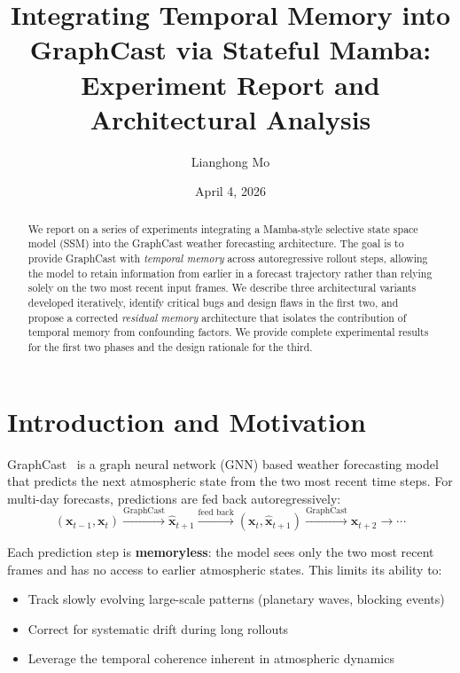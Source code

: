 \documentclass[11pt,a4paper]{article}
\title{Integrating Temporal Memory into GraphCast via Stateful Mamba:\\Experiment Report and Architectural Analysis}
\author{Lianghong Mo}
\date{April 4, 2026}
\begin{document}
\maketitle

\begin{abstract}
We report on a series of experiments integrating a Mamba-style selective state space model (SSM) into the GraphCast weather forecasting architecture. The goal is to provide GraphCast with \emph{temporal memory} across autoregressive rollout steps, allowing the model to retain information from earlier in a forecast trajectory rather than relying solely on the two most recent input frames. We describe three architectural variants developed iteratively, identify critical bugs and design flaws in the first two, and propose a corrected \emph{residual memory} architecture that isolates the contribution of temporal memory from confounding factors. We provide complete experimental results for the first two phases and the design rationale for the third.
\end{abstract}

\tableofcontents
\newpage

\section{Introduction and Motivation}

GraphCast~\cite{lam2023graphcast} is a graph neural network (GNN) based weather forecasting model that predicts the next atmospheric state from the two most recent time steps. For multi-day forecasts, predictions are fed back autoregressively:
\[
(\mathbf{x}_{t-1}, \mathbf{x}_t) \xrightarrow{\text{GraphCast}} \hat{\mathbf{x}}_{t+1} \xrightarrow{\text{feed back}} (\mathbf{x}_t, \hat{\mathbf{x}}_{t+1}) \xrightarrow{\text{GraphCast}} \hat{\mathbf{x}}_{t+2} \rightarrow \cdots
\]

Each prediction step is \textbf{memoryless}: the model sees only the two most recent frames and has no access to earlier atmospheric states. This limits its ability to:
\begin{itemize}[nosep]
    \item Track slowly evolving large-scale patterns (planetary waves, blocking events)
    \item Correct for systematic drift during long rollouts
    \item Leverage the temporal coherence inherent in atmospheric dynamics
\end{itemize}
\end{document}

